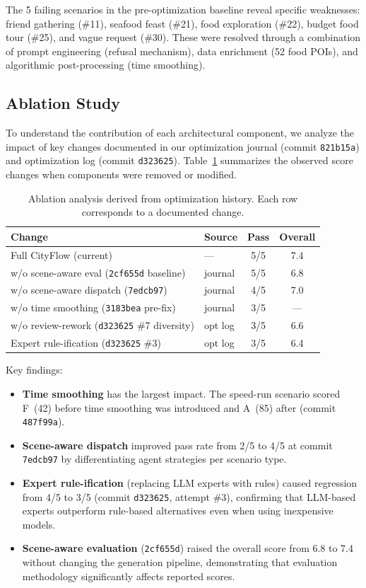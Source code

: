 The 5 failing scenarios in the pre-optimization baseline reveal specific weaknesses: friend gathering (\#11), seafood feast (\#21), food exploration (\#22), budget food tour (\#25), and vague request (\#30). These were resolved through a combination of prompt engineering (refusal mechanism), data enrichment (52 food POIs), and algorithmic post-processing (time smoothing).

\subsection{Ablation Study}

To understand the contribution of each architectural component, we analyze the impact of key changes documented in our optimization journal (commit \texttt{821b15a}) and optimization log (commit \texttt{d323625}). Table~\ref{tab:ablation} summarizes the observed score changes when components were removed or modified.

\begin{table}[H]
\centering
\caption{Ablation analysis derived from optimization history. Each row corresponds to a documented change.}
\label{tab:ablation}
\begin{tabular}{@{}llcc@{}}
\toprule
\textbf{Change} & \textbf{Source} & \textbf{Pass} & \textbf{Overall} \\
\midrule
Full CityFlow (current) & --- & 5/5 & 7.4 \\
\midrule
w/o scene-aware eval (\texttt{2cf655d} baseline) & journal & 5/5 & 6.8 \\
w/o scene-aware dispatch (\texttt{7edcb97}) & journal & 4/5 & 7.0 \\
w/o time smoothing (\texttt{3183bea} pre-fix) & journal & 3/5 & --- \\
w/o review-rework (\texttt{d323625} \#7 diversity) & opt log & 3/5 & 6.6 \\
Expert rule-ification (\texttt{d323625} \#3) & opt log & 3/5 & 6.4 \\
\bottomrule
\end{tabular}
\end{table}

Key findings:
\begin{itemize}[leftmargin=*]
    \item \textbf{Time smoothing} has the largest impact. The speed-run scenario scored F~(42) before time smoothing was introduced and A~(85) after (commit \texttt{487f99a}).
    \item \textbf{Scene-aware dispatch} improved pass rate from 2/5 to 4/5 at commit \texttt{7edcb97} by differentiating agent strategies per scenario type.
    \item \textbf{Expert rule-ification} (replacing LLM experts with rules) caused regression from 4/5 to 3/5 (commit \texttt{d323625}, attempt \#3), confirming that LLM-based experts outperform rule-based alternatives even when using inexpensive models.
    \item \textbf{Scene-aware evaluation} (\texttt{2cf655d}) raised the overall score from 6.8 to 7.4 without changing the generation pipeline, demonstrating that evaluation methodology significantly affects reported scores.
\end{itemize}

